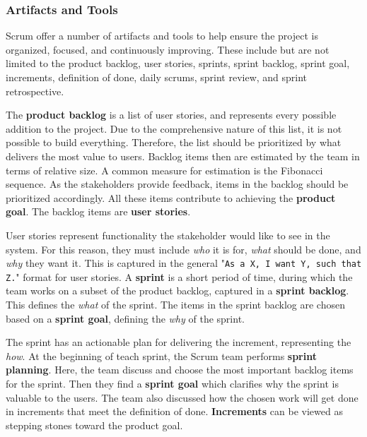 \subsubsection*{Artifacts and Tools}
Scrum offer a number of artifacts and tools to help ensure the project is organized, focused, and continuously improving. These include but are not limited to the product backlog, user stories, sprints, sprint backlog, sprint goal, increments, definition of done, daily scrums, sprint review, and sprint retrospective.\cite{sutherlandScrumArtDoing2014}

The \textbf{product backlog} is a list of user stories, and represents every possible addition to the project.
Due to the comprehensive nature of this list, it is not possible to build everything.
Therefore, the list should be prioritized by what delivers the most value to users.
Backlog items then are estimated by the team in terms of relative size.
A common measure for estimation is the Fibonacci sequence.
As the stakeholders provide feedback, items in the backlog should be prioritized accordingly.
All these items contribute to achieving the \textbf{product goal}.
The backlog items are \textbf{user stories}.

User stories represent functionality the stakeholder would like to see in the system.
For this reason, they must include \textit{who} it is for, \textit{what} should be done, and \textit{why} they want it.
This is captured in the general "\texttt{As a X, I want Y, such that Z.}" format for user stories.
A \textbf{sprint} is a short period of time, during which the team works on a subset of the product backlog, captured in a \textbf{sprint backlog}.
This defines the \textit{what} of the sprint.
The items in the sprint backlog are chosen based on a \textbf{sprint goal}, defining the \textit{why} of the sprint.


The sprint has an actionable plan for delivering the increment, representing the \textit{how}. 
At the beginning of teach sprint, the Scrum team performs \textbf{sprint planning}.
Here, the team discuss and choose the most important backlog items for the sprint.
Then they find a \textbf{sprint goal} which clarifies why the sprint is valuable to the users.
The team also discussed how the chosen work will get done in increments that meet the definition of done.
\textbf{Increments} can be viewed as stepping stones toward the product goal.

